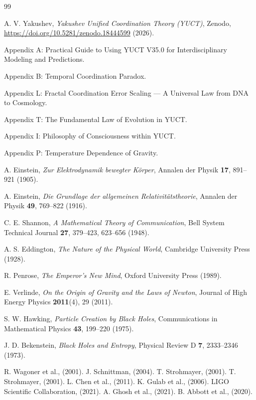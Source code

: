 \documentclass[12pt,a4paper]{article}
\begin{document}
	\begin{thebibliography}{99}
		
		A. V. Yakushev, \emph{Yakushev Unified Coordination Theory (YUCT)}, Zenodo, \url{https://doi.org/10.5281/zenodo.18444599} (2026).
		
		Appendix A: Practical Guide to Using YUCT V35.0 for Interdisciplinary Modeling and Predictions.
		
		Appendix B: Temporal Coordination Paradox.
		
		Appendix L: Fractal Coordination Error Scaling — A Universal Law from DNA to Cosmology.
		
		Appendix T: The Fundamental Law of Evolution in YUCT.
		
		Appendix I: Philosophy of Consciousness within YUCT.
		
		Appendix P: Temperature Dependence of Gravity.
		
		A. Einstein, \emph{Zur Elektrodynamik bewegter Körper}, Annalen der Physik \textbf{17}, 891–921 (1905).
		
		A. Einstein, \emph{Die Grundlage der allgemeinen Relativitätstheorie}, Annalen der Physik \textbf{49}, 769–822 (1916).
		
		C. E. Shannon, \emph{A Mathematical Theory of Communication}, Bell System Technical Journal \textbf{27}, 379–423, 623–656 (1948).
		
		A. S. Eddington, \emph{The Nature of the Physical World}, Cambridge University Press (1928).
		
		R. Penrose, \emph{The Emperor's New Mind}, Oxford University Press (1989).
		
		E. Verlinde, \emph{On the Origin of Gravity and the Laws of Newton}, Journal of High Energy Physics \textbf{2011}(4), 29 (2011).
		
		S. W. Hawking, \emph{Particle Creation by Black Holes}, Communications in Mathematical Physics \textbf{43}, 199–220 (1975).
		
		J. D. Bekenstein, \emph{Black Holes and Entropy}, Physical Review D \textbf{7}, 2333–2346 (1973).
		
		 R. Wagoner et al., (2001).
		 J. Schnittman, (2004).
		 T. Strohmayer, (2001).
		 T. Strohmayer, (2001).
		 L. Chen et al., (2011).
		 K. Gulab et al., (2006).
		 LIGO Scientific Collaboration, (2021).
		 A. Ghosh et al., (2021).
		 B. Abbott et al., (2020).
		
	\end{thebibliography}
	
\end{document}
